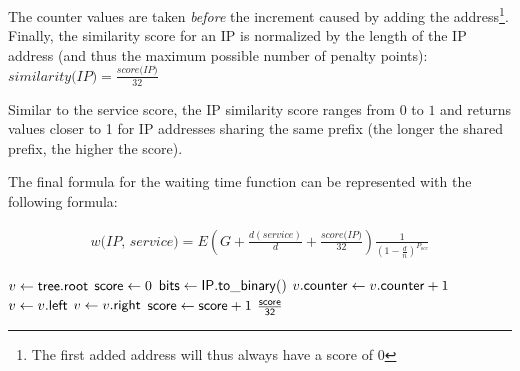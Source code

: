 The counter values are taken \emph{before} the increment caused by adding the address\footnote{The first added address will thus always have a score of $0$}. 
Finally, the similarity score for an IP is normalized by the length of the IP address (and thus the maximum possible number of penalty points): $\textit{similarity(IP}) = \frac{\textit{score(IP)}}{32}$

Similar to the service score, the IP similarity score ranges from $0$ to $1$ and returns values closer to 1 for IP addresses sharing the same prefix (the longer the shared prefix, the higher the score).

The final formula for the waiting time function can be represented with the following formula:%

\begin{equation}
\begin{split}
    \textit{w(IP, service)} = 
    E(G + \frac{d(\textit{service})}{d} + \frac{\textit{score(IP)}}{32}
    )
    \frac{1}{(1-\frac{d}{n})^{P_\textit{occ}}}
\end{split}
\end{equation}


\begin{algorithm}[]%
    \caption{%
        Adding an address to the IP tree.
    }%
    \label{alg:tree}%
    \begin{algorithmic}[1]%
         \footnotesize
            \State $v \gets \mathsf{tree.root}$
            \State $\mathsf{score} \gets 0$
            \State $\mathsf{bits} \gets \mathsf{IP.to\_binary()}$
                \State $v\mathsf{.counter} \gets v\mathsf{.counter} + 1$
                    \State $v \gets v\mathsf{.left}$
                \Else
                    \State $v \gets v\mathsf{.right}$
                \EndIf
                    \State $\mathsf{score} \gets \mathsf{score} + 1$
                \EndIf
            \EndFor
            \State \Return $\mathsf{\frac{score}{32}}$
        \EndProcedure
    \end{algorithmic}%
\end{algorithm}%

